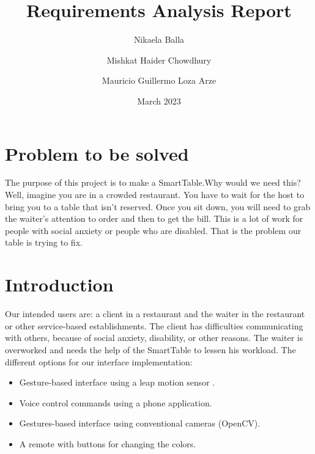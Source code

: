 \documentclass{article}
\title{Requirements Analysis Report}
\author{Nikaela Balla
\and Mishkat Haider Chowdhury
\and Mauricio Guillermo Loza Arze}
\date{March 2023}
\begin{document}
\maketitle

\section{ Problem to be solved}
\label{sec:problem}
The purpose of this project is to make a SmartTable.Why would we need this? 
Well, imagine you are in a crowded restaurant. You have to wait for the host to bring you to a table that isn't reserved. Once you sit down,
you will need to grab the waiter's attention to order and then to get the bill. This is a lot of work for people with social anxiety or people 
who are disabled. That is the problem our table is trying to fix. 
\section{ Introduction}
Our intended users are: a client in a restaurant and the waiter in the restaurant or other service-based establishments.
The client has difficulties communicating with others, because of social anxiety, disability, or other reasons. The waiter is overworked and
needs the help of the SmartTable to lessen his workload.
The different options for our interface implementation: \begin{itemize}
    \item Gesture-based interface using a leap motion sensor \cite{zaicti2015free}.
    \item  Voice control commands using a phone application.
    \item  Gestures-based interface using conventional cameras (OpenCV).
    \item A remote with buttons for changing the colors.
\end{itemize}
\end{document}
